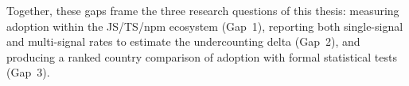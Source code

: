 Together, these gaps frame the three research questions of this thesis: measuring
adoption within the JS/TS/npm ecosystem (Gap~1), reporting both single-signal and
multi-signal rates to estimate the undercounting delta (Gap~2), and producing a
ranked country comparison of adoption with formal statistical tests (Gap~3).
